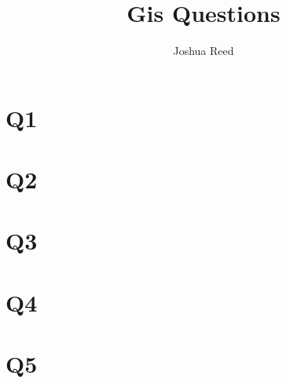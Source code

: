 \documentclass{article}
\author{Joshua Reed}
\title{Gis Questions}
\begin{document}
\maketitle{}
\section*{Q1}

\section*{Q2}
\section*{Q3}
\section*{Q4}
\section*{Q5}
\end{document}
